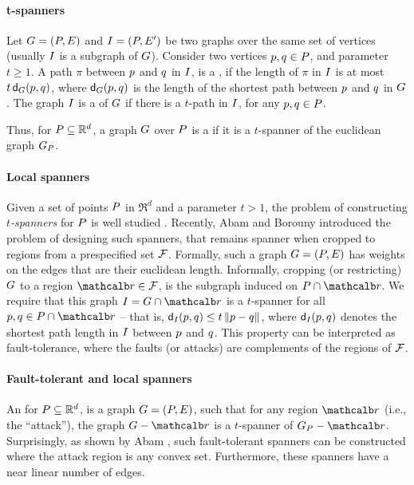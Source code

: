 \documentclass[12pt]{article}%
\begin{document}
\paragraph{t-spanners}
Let $G=(P,E)$ and $I=(P,E')$ be two graphs over the same
set of vertices (usually $I$ is a subgraph of $G$). Consider two
vertices $p,q \in P$, and parameter $t \geq 1$.  A path $\pi$
between $p$ and $q$ in $I$, is a , if the length
of $\pi$ in $I$ is at most $t\,\dGZ{\G}{\pa}{\pb}$, where
$\dGZ{\G}{\pa}{\pb}$ is the length of the shortest path between $p$
and $q$ in $G$.  The graph $I$ is a  of $G$
if there is a $t$-path in $I$, for any $p,q\in P$.

Thus, for $P\subseteq \mathbb{R}^d$, a graph $G$ over $P$ is a
 if it is a $t$-spanner of the euclidean graph
$G_P$.


\paragraph{Local spanners}
Given a set of points $P$ in $\Re^d$ and a parameter $t>1$, the
problem of constructing \emph{$t$-spanners} for $P$ is well studied
\cite{ns-gsn-07}.  Recently, Abam and Borouny \cite{ab-lgs-21}
introduced the problem of designing such spanners, that remains
spanner when cropped to regions from a prespecified set
$\mathcal{F}$. Formally, such a graph $G = (P,E)$ has weights on the
edges that are their euclidean length. Informally, cropping (or
restricting) $G$ to a region $\region \in \FF$, is the subgraph
induced on $\PS \cap \region$. We require that this graph
$\GB = \restrictY{\G}{\region}$ is a $t$-spanner for all
$\pa,\pb \in \PS \cap \region$ -- that is,
$\dGZ{\GB}{\pa}{\pb} \leq t \dY{\pa}{\pb}$, where
$\dGZ{\GB}{\pa}{\pb}$ denotes the shortest path length in $I$
between $p$ and $q$.  This property can be interpreted as
fault-tolerance, where the faults (or attacks) are complements of the
regions of $\mathcal{F}$.






\paragraph{Fault-tolerant and local spanners}

An  for $P\subseteq \mathbb{R}^d$, is
a graph $G=(P, E)$, such that for any region $\region$ (i.e., the
``attack''), the graph $\G \gminus \region$ is a $t$-spanner of
$\G_\PS - \region$. Surprisingly, as shown by Abam \etal
\cite{abfg-rftgs-09}, such fault-tolerant spanners can be constructed
where the attack region is any convex set. Furthermore, these spanners
have a near linear number of edges.
\end{document}
